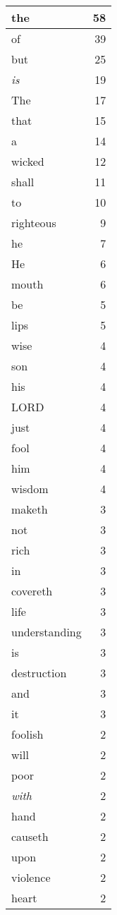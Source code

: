 \begin{center}
\begin{longtable}{l|r}
the & 58\\ \hline 
of & 39\\ \hline 
but & 25\\ \hline 
\emph{is} & 19\\ \hline 
The & 17\\ \hline 
that & 15\\ \hline 
a & 14\\ \hline 
wicked & 12\\ \hline 
shall & 11\\ \hline 
to & 10\\ \hline 
righteous & 9\\ \hline 
he & 7\\ \hline 
He & 6\\ \hline 
mouth & 6\\ \hline 
be & 5\\ \hline 
lips & 5\\ \hline 
wise & 4\\ \hline 
son & 4\\ \hline 
his & 4\\ \hline 
LORD & 4\\ \hline 
just & 4\\ \hline 
fool & 4\\ \hline 
him & 4\\ \hline 
wisdom & 4\\ \hline 
maketh & 3\\ \hline 
not & 3\\ \hline 
rich & 3\\ \hline 
in & 3\\ \hline 
covereth & 3\\ \hline 
life & 3\\ \hline 
understanding & 3\\ \hline 
is & 3\\ \hline 
destruction & 3\\ \hline 
and & 3\\ \hline 
it & 3\\ \hline 
foolish & 2\\ \hline 
will & 2\\ \hline 
poor & 2\\ \hline 
\emph{with} & 2\\ \hline 
hand & 2\\ \hline 
causeth & 2\\ \hline 
upon & 2\\ \hline 
violence & 2\\ \hline 
heart & 2\\ \hline 

\end{longtable}
\end{center}

